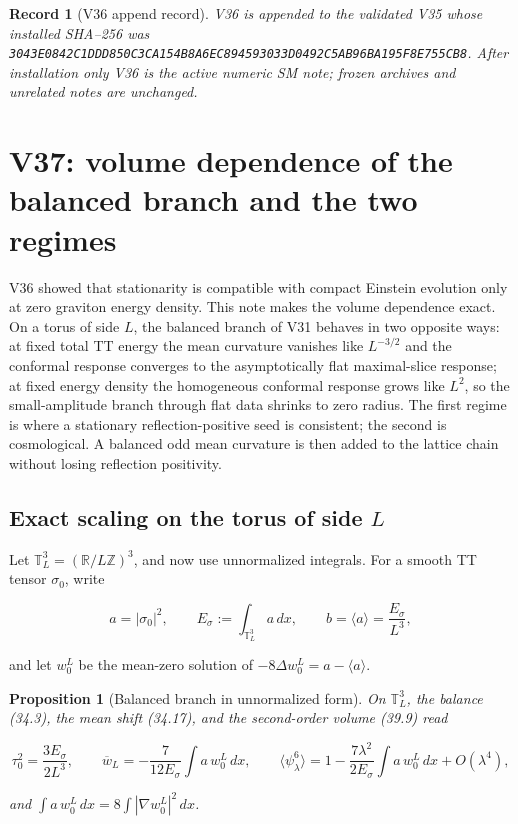 \documentclass[11pt]{article}
\newtheorem{proposition}[theorem]{Proposition}
\newtheorem{record}[theorem]{Record}
\theoremstyle{remark}
\begin{document}
\begin{record}[V36 append record]
\label{rec:v19v36}
V36 is appended to the validated V35 whose installed SHA--256 was
\texttt{3043E0842C1DDD850C3CA154B8A6EC894593033D0492C5AB96BA195F8E755CB8}.
After installation only V36 is the active numeric SM note; frozen
archives and unrelated notes are unchanged.
\end{record}


\section{V37: volume dependence of the balanced branch and the two regimes}
\label{sec:v19v37}

V36 showed that stationarity is compatible with compact Einstein
evolution only at zero graviton energy density.  This note makes the
volume dependence exact.  On a torus of side \(L\), the balanced branch
of V31 behaves in two opposite ways: at fixed total TT energy the mean
curvature vanishes like \(L^{-3/2}\) and the conformal response converges
to the asymptotically flat maximal-slice response; at fixed energy
density the homogeneous conformal response grows like \(L^2\), so the
small-amplitude branch through flat data shrinks to zero radius.  The
first regime is where a stationary reflection-positive seed is
consistent; the second is cosmological.  A balanced odd mean curvature is
then added to the lattice chain without losing reflection positivity.

\subsection{Exact scaling on the torus of side \(L\)}

Let \(\mathbb T^3_L=(\mathbb R/L\mathbb Z)^3\), and now use unnormalized
integrals.  For a smooth TT tensor \(\sigma_0\), write

\[
 a=|\sigma_0|^2,\qquad E_\sigma:=\int_{\mathbb T^3_L}a\,dx,\qquad
 b=\langle a\rangle=\frac{E_\sigma}{L^3},                          \tag{40.1}
\]

and let \(w_0^L\) be the mean-zero solution of
\(-8\Delta w_0^L=a-\langle a\rangle\).

\begin{proposition}[Balanced branch in unnormalized form]
\label{prop:v19v37-scaling}
On \(\mathbb T^3_L\), the balance (34.3), the mean shift (34.17), and
the second-order volume (39.9) read

\[
 \tau_0^2=\frac{3E_\sigma}{2L^3},\qquad
 \overline w_L=-\frac{7}{12E_\sigma}\int a\,w_0^L\,dx,\qquad
 \langle\psi_\lambda^6\rangle
 =1-\frac{7\lambda^2}{2E_\sigma}\int a\,w_0^L\,dx+O(\lambda^4),      \tag{40.2}
\]

and \(\int a\,w_0^L\,dx=8\int|\nabla w_0^L|^2\,dx\).
\end{proposition}
\end{document}
